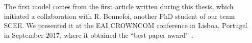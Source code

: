 The first model comes from the first article written during this thesis, which initiated a collaboration with R. Bonnefoi, another PhD student of our team SCEE.
We presented it at the EAI CROWNCOM conference in Lisboa, Portugal in September $2017$, where it obtained the ``best paper award'' \cite{Bonnefoi17}.
%
